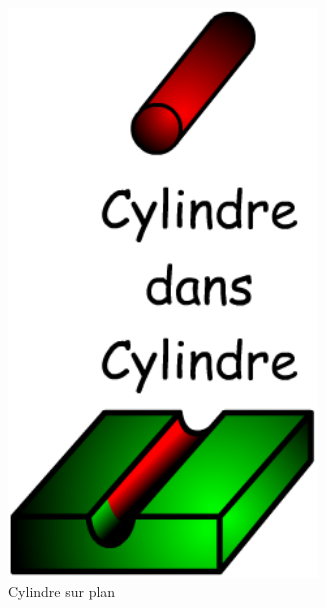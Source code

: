 \documentclass[10pt,fleqn,draft]{article} %
\begin{document}
\begin{figure}[h]
\begin{subfigure}[b]{0.3\textwidth}
    \includegraphics[width=0.9\textwidth,height=.15\textheight,keepaspectratio]{images/surface_cylindre}
    \caption{Cylindre sur plan}
  \end{subfigure}\hfill
  \begin{subfigure}[b]{0.3\textwidth}
    \centering

\end{subfigure}
\end{figure}
\end{document}
